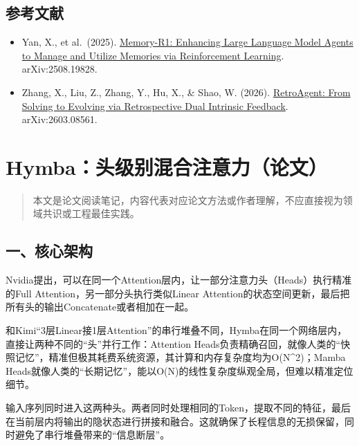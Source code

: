 \hypertarget{ux53c2ux8003ux6587ux732e-140}{%
\subsection{参考文献}\label{ux53c2ux8003ux6587ux732e-140}}

\begin{itemize}
\tightlist
\item
  Yan, X., et al.~(2025). \href{https://arxiv.org/abs/2508.19828}{Memory-R1: Enhancing Large Language Model Agents to Manage and Utilize Memories via Reinforcement Learning}. arXiv:2508.19828.
\item
  Zhang, X., Liu, Z., Zhang, Y., Hu, X., \& Shao, W. (2026). \href{https://arxiv.org/abs/2603.08561}{RetroAgent: From Solving to Evolving via Retrospective Dual Intrinsic Feedback}. arXiv:2603.08561.
\end{itemize}

\clearpage

\hypertarget{hymbaux5934ux7ea7ux522bux6df7ux5408ux6ce8ux610fux529bux8bbaux6587}{%
\section{Hymba：头级别混合注意力（论文）}\label{hymbaux5934ux7ea7ux522bux6df7ux5408ux6ce8ux610fux529bux8bbaux6587}}

\begin{quote}
本文是论文阅读笔记，内容代表对应论文方法或作者理解，不应直接视为领域共识或工程最佳实践。
\end{quote}

\hypertarget{ux4e00ux6838ux5fc3ux67b6ux6784-4}{%
\subsection{一、核心架构}\label{ux4e00ux6838ux5fc3ux67b6ux6784-4}}

Nvidia提出，可以在同一个Attention层内，让一部分注意力头（Heads）执行精准的Full Attention，另一部分头执行类似Linear Attention的状态空间更新，最后把所有头的输出Concatenate或者相加在一起。

和Kimi``3层Linear接1层Attention''的串行堆叠不同，Hymba在同一个网络层内，直接让两种不同的``头''并行工作：Attention Heads负责精确召回，就像人类的``快照记忆''，精准但极其耗费系统资源，其计算和内存复杂度均为O(N\^{}2)；Mamba Heads就像人类的``长期记忆''，能以O(N)的线性复杂度纵观全局，但难以精准定位细节。

输入序列同时进入这两种头。两者同时处理相同的Token，提取不同的特征，最后在当前层内将输出的隐状态进行拼接和融合。这就确保了长程信息的无损保留，同时避免了串行堆叠带来的``信息断层''。

